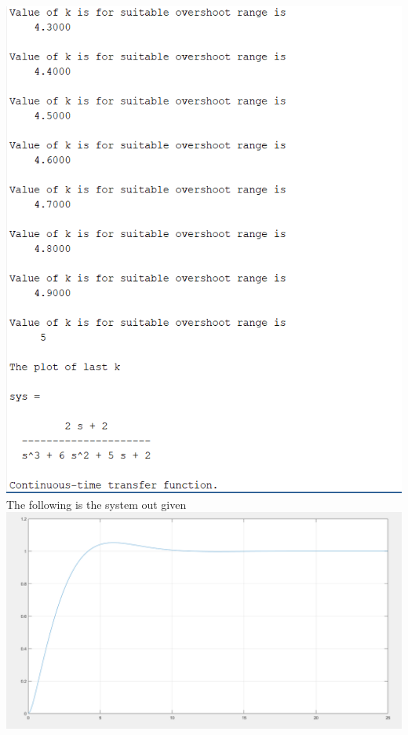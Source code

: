 \documentclass[12pt]{article}
\begin{document}
\includegraphics[scale=0.4]{../Lab8/Pictures/LabProblem2Result_Valueofk_and_sys.png}   \\

\cleardoublepage
The following is the system out given\\

\includegraphics[scale=0.4]{../Lab8/Pictures/LabProblem2Result1_Transfer_Funtion_plot.png}  \\
\end{document}
